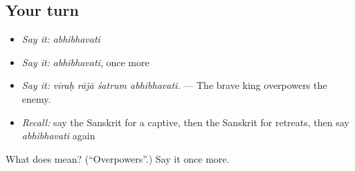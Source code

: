 \subsection*{Your turn}
\begin{itemize}
\raggedright
  \item \emph{Say it:} \emph{abhibhavati}
  \item \emph{Say it:} \emph{abhibhavati}, once more
  \item \emph{Say it:} \emph{vīraḥ rājā śatrum abhibhavati.} — The brave king overpowers the enemy.
  \item \emph{Recall:} say the Sanskrit for a captive, then the Sanskrit for retreats, then say \emph{abhibhavati} again
\end{itemize}

\begin{tcolorbox}[breakable,colback=teal!4,colframe=teal!35!black,title={Before you move on}]
What does  mean? (\textquotedblleft{}Overpowers\textquotedblright{}.) Say it once more.
\end{tcolorbox}
